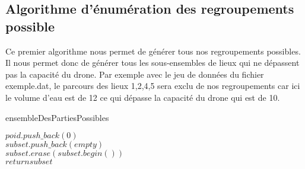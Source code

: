 \documentclass[a4paper,sffamily,12pt]{article}
\begin{document}
		\vspace{0.5cm}
		
		\subsection{Algorithme d'énumération des regroupements possible}
			
			\vspace{0.5cm}

			Ce premier algorithme nous permet de générer tous nos regroupements possibles. Il nous permet donc de générer tous les sous-ensembles de lieux qui ne dépassent pas la capacité du drone. Par exemple avec le jeu de données du fichier exemple.dat, le parcours des lieux 1,2,4,5 sera exclu de nos regroupements car ici le volume d'eau est de 12 ce qui dépasse la capacité du drone qui est de 10.

			\newpage 

			\IncMargin{1em}
			\begin{algorithm}
				\caption{ensembleDesPartiesPossibles}				
				\BlankLine
				$poid.push\_back(0)$\\
				$subset.push\_back(empty)$\\
				$subset.erase(subset.begin())$\\
				$return subset$ \\
			\end{algorithm}\DecMargin{1em}
\end{document}
